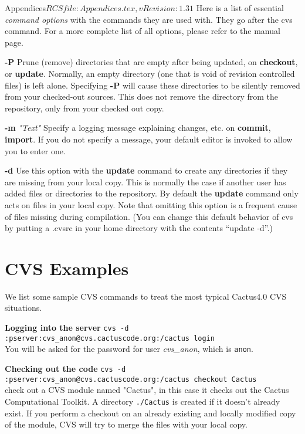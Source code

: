 \begin{cactuspart}{6}{Appendices}{$RCSfile: Appendices.tex,v $}{$Revision: 1.31 $}
Here is a list of essential {\em command options} with the
commands they are used with. They go after the cvs command. For a more
complete list of all options, please refer to the manual page.

\begin{Lentry}

\item[{\bf -P}]
Prune  (remove)  directories  that  are empty after being updated, on
{\bf checkout}, or  {\bf update}.   Normally, an  empty  directory
(one that is void of revision controlled files) is  left  alone.
Specifying  {\bf -P} will cause these directories to be silently
removed from  your  checked-out  sources.   This  does  not  remove
the directory from the repository, only from your checked out copy.

\item[{\bf -m} {\em "Text"}]
Specify a logging message explaining changes, etc. on {\bf commit},
{\bf import}. If you do not specify a message, your default editor
is invoked to allow you to enter one.

\item[\bf -d]
Use this option with the {\bf update} command to create any
directories if they are missing from your local copy. This is normally
the case if another user has added files or directories to the
repository. By default the {\bf update} command only acts on files in
your local copy. Note that omitting this option is a frequent cause of
files missing during compilation.  (You can change this
default behavior of cvs by putting a .cvsrc in your home directory
with the contents ``update -d''.)

\end{Lentry}

\section{CVS Examples}
We list some sample CVS commands to treat the most typical Cactus4.0
CVS situations.
\begin{description}
\item\textbf{Logging into the server}\newline
{\tt cvs -d :pserver:cvs\_anon@cvs.cactuscode.org:/cactus
login} \\ You will be asked for the password for user {\em cvs\_anon}, which is {\tt anon}.

\item\textbf{Checking out the code}\newline
{\tt cvs -d :pserver:cvs\_anon@cvs.cactuscode.org:/cactus
checkout Cactus}\\
check out a CVS module named "Cactus", in this case it checks out the
Cactus Computational Toolkit. A directory {\tt ./Cactus} is created if
it doesn't already exist. If you perform a checkout on an already
existing and locally modified copy of the module, CVS will try to merge the files
with your local copy.


\end{description}
\end{cactuspart}
